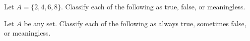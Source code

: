 \documentclass[11pt]{exam}
\def\pow{\mathcal{P}}
\begin{document}


\begin{questions}
\question Let $A = \{2, 4, 6, 8\}$.  Classify each of the following as true, false, or meaningless.
\begin{multicols}{3}

\end{multicols}

\vfill

\question Let $A$ be any set.  Classify each of the following as always true, sometimes false, or meaningless.
\begin{multicols}{3}
\end{multicols}
\end{questions}
\end{document}
